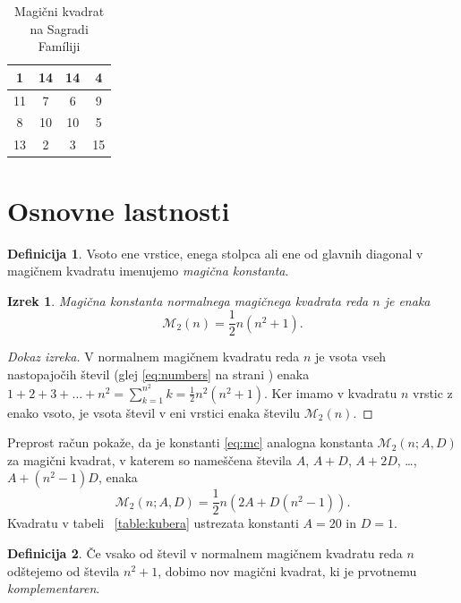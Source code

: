 \documentclass[a4paper,12pt]{article}
\newcommand{\pojem}[1]{\emph{\color{purple}#1}}
\newcommand{\m}{\mathcal{M}_2}
\theoremstyle{definition}
\newtheorem{definicija}{Definicija}
\theoremstyle{plain}
\newtheorem{izrek}{Izrek}
\newenvironment{dokaz}
{\begin{proof}[Dokaz izreka]}
{\end{proof}}
\newenvironment{magic}[3]
{\begin{table}[!ht]
   \centering
   \caption{#2}
   \label{#3}
   \large
   \begin{tabular}{|*{#1}{c|}}
   \hline
   }
{\end{tabular}
   \normalsize
\end{table}}
\begin{document}
    \begin{magic}{4}{Magični kvadrat na Sagradi Famíliji}{table:sagrada}
      1 & 14 & 14 &  4 \\\hline
     11 &  7 &  6 &  9 \\\hline
      8 & 10 & 10 &  5 \\\hline
     13 &  2 &  3 & 15 \\\hline
    \end{magic}


\section{Osnovne lastnosti}

\begin{definicija}
   Vsoto ene vrstice, enega stolpca ali ene od glavnih diagonal
   v magičnem kvadratu imenujemo \pojem{magična konstanta}.
\end{definicija}

\begin{izrek}
   Magična konstanta normalnega magičnega kvadrata reda \(n\)
   je enaka
   \begin{equation}
      \label{eq:mc}
      \m(n) = \frac{1}{2} n(n^2+1).
   \end{equation}
\end{izrek}

\begin{dokaz}
   V normalnem magičnem kvadratu reda \(n\) je vsota vseh nastopajočih
   števil (glej \eqref{eq:numbers} na strani \pageref{eq:numbers}) enaka
   \(1+2+3+\ldots+n^2=\sum_{k=1}^{n^2}k=\frac{1}{2}n^2(n^2+1)\). Ker imamo
   v kvadratu \(n\) vrstic z enako vsoto, je vsota števil v eni vrstici
   enaka številu \(\m(n)\).
\end{dokaz}

Preprost račun pokaže, da je konstanti \eqref{eq:mc} analogna konstanta
\(\m(n;A,D)\) za magični kvadrat, v katerem so nameščena števila
\(A\), \(A+D\), \(A+2D\), \ldots, \(A+(n^2-1)D\), enaka
\[
   \m(n;A,D) = \frac{1}{2} n \left(2A+D(n^2-1)\right).
\]
Kvadratu v tabeli ~\ref{table:kubera} ustrezata konstanti \(A=20\) in \(D=1\). %

\begin{definicija}
   Če vsako od števil v normalnem magičnem kvadratu reda \(n\) odštejemo
   od števila \(n^2+1\), dobimo nov magični kvadrat, ki je prvotnemu
   \pojem{komplementaren}.
\end{definicija}
\end{document}
